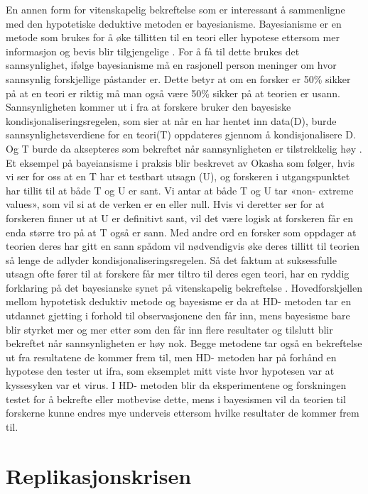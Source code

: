 \documentclass[
]{book}
\begin{document}
En annen form for vitenskapelig bekreftelse som er interessant å sammenligne med den hypotetiske deduktive metoden er bayesianisme.
Bayesianisme er en metode som brukes for å øke tillitten til en teori eller hypotese ettersom mer informasjon og bevis blir tilgjengelige \citet{okasha2016}.
For å få til dette brukes det sannsynlighet, ifølge bayesianisme må en rasjonell person meninger om hvor sannsynlig forskjellige påstander er.
Dette betyr at om en forsker er 50\% sikker på at en teori er riktig må man også være 50\% sikker på at teorien er usann.
Sannsynligheten kommer ut i fra at forskere bruker den bayesiske kondisjonaliseringsregelen, som sier at når en har hentet inn data(D), burde sannsynlighetsverdiene for en teori(T) oppdateres gjennom å kondisjonalisere D.
Og T burde da aksepteres som bekreftet når sannsynligheten er tilstrekkelig høy \citet{okasha2016}.
Et eksempel på bayeiansisme i praksis blir beskrevet av Okasha \citet{okasha2016} som følger, hvis vi ser for oss at en T har et testbart utsagn (U), og forskeren i utgangspunktet har tillit til at både T og U er sant.
Vi antar at både T og U tar «non- extreme values», som vil si at de verken er en eller null.
Hvis vi deretter ser for at forskeren finner ut at U er definitivt sant, vil det være logisk at forskeren får en enda større tro på at T også er sann.
Med andre ord en forsker som oppdager at teorien deres har gitt en sann spådom vil nødvendigvis øke deres tillitt til teorien så lenge de adlyder kondisjonaliseringsregelen.
Så det faktum at suksessfulle utsagn ofte fører til at forskere får mer tiltro til deres egen teori, har en ryddig forklaring på det bayesianske synet på vitenskapelig bekreftelse \citet{okasha2016}.
Hovedforskjellen mellom hypotetisk deduktiv metode og bayesisme er da at HD- metoden tar en utdannet gjetting i forhold til observasjonene den får inn, mens bayesisme bare blir styrket mer og mer etter som den får inn flere resultater og tilslutt blir bekreftet når sannsynligheten er høy nok.
Begge metodene tar også en bekreftelse ut fra resultatene de kommer frem til, men HD- metoden har på forhånd en hypotese den tester ut ifra, som eksemplet mitt viste hvor hypotesen var at kyssesyken var et virus.
I HD- metoden blir da eksperimentene og forskningen testet for å bekrefte eller motbevise dette, mens i bayesismen vil da teorien til forskerne kunne endres mye underveis ettersom hvilke resultater de kommer frem til.

\hypertarget{replikasjonskrisen}{%
\section{Replikasjonskrisen}\label{replikasjonskrisen}}
\end{document}
